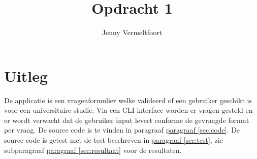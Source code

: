 \documentclass[10pt]{article}
\title{Opdracht 1}
\author{Jenny Vermeltfoort}
\begin{document}

\maketitle

\section{Uitleg}
De applicatie is een vragenformulier welke valideerd of een gebruiker geschikt is voor een universitaire studie. Via
een CLI-interface worden er vragen gesteld en er wordt verwacht dat de gebruiker input levert conforme de gevraagde
format per vraag. De source code is te vinden in paragraaf \hyperref[sec:code]{paragraaf \ref{sec:code}}. De source
code is getest met de test beschreven in \hyperref[sec:test]{paragraaf \ref{sec:test}}, zie subparagraaf
\hyperref[sec:resultaat]{paragraaf \ref{sec:resultaat}} voor de
resultaten.
\end{document}
